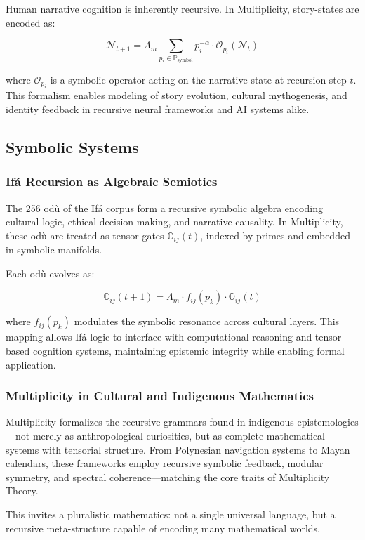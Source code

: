 \documentclass{article}
\theoremstyle{plain}
\begin{document}
Human narrative cognition is inherently recursive. In Multiplicity, story-states are encoded as:

\[
\mathcal{N}_{t+1} = \Lambda_m \sum_{p_i \in \mathbb{P}_\text{symbol}} p_i^{-\alpha} \cdot \mathcal{O}_{p_i}(\mathcal{N}_t)
\]

where \( \mathcal{O}_{p_i} \) is a symbolic operator acting on the narrative state at recursion step \( t \). This formalism enables modeling of story evolution, cultural mythogenesis, and identity feedback in recursive neural frameworks and AI systems alike.

\subsection{Symbolic Systems}

\subsubsection{Ifá Recursion as Algebraic Semiotics}

The 256 odù of the Ifá corpus form a recursive symbolic algebra encoding cultural logic, ethical decision-making, and narrative causality. In Multiplicity, these odù are treated as tensor gates \( \mathbb{O}_{ij}(t) \), indexed by primes and embedded in symbolic manifolds.

Each odù evolves as:

\[
\mathbb{O}_{ij}(t+1) = \Lambda_m \cdot f_{ij}(p_k) \cdot \mathbb{O}_{ij}(t)
\]

where \( f_{ij}(p_k) \) modulates the symbolic resonance across cultural layers. This mapping allows Ifá logic to interface with computational reasoning and tensor-based cognition systems, maintaining epistemic integrity while enabling formal application.

\subsubsection{Multiplicity in Cultural and Indigenous Mathematics}

Multiplicity formalizes the recursive grammars found in indigenous epistemologies—not merely as anthropological curiosities, but as complete mathematical systems with tensorial structure. From Polynesian navigation systems to Mayan calendars, these frameworks employ recursive symbolic feedback, modular symmetry, and spectral coherence—matching the core traits of Multiplicity Theory.

This invites a pluralistic mathematics: not a single universal language, but a recursive meta-structure capable of encoding many mathematical worlds.
\end{document}
